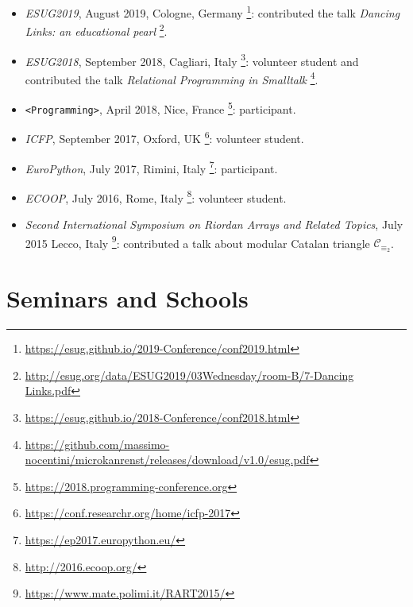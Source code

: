 \documentclass[a4paper]{article} %
\begin{document}
    \begin{itemize}
        \item \emph{ESUG2019}, August 2019, Cologne, Germany \footnote{\url{https://esug.github.io/2019-Conference/conf2019.html}}: 
		contributed the talk \textit{Dancing Links: an educational pearl} \footnote{\url{http://esug.org/data/ESUG2019/03Wednesday/room-B/7-Dancing Links.pdf}}.
        \item \emph{ESUG2018}, September 2018, Cagliari, Italy \footnote{\url{https://esug.github.io/2018-Conference/conf2018.html}}: volunteer student and
        contributed the talk \textit{Relational Programming in Smalltalk} \footnote{\url{https://github.com/massimo-nocentini/microkanrenst/releases/download/v1.0/esug.pdf}}.
        \item \texttt{<Programming>}, April 2018, Nice, France \footnote{\url{https://2018.programming-conference.org}}: participant.
        \item \emph{ICFP}, September 2017, Oxford, UK \footnote{\url{https://conf.researchr.org/home/icfp-2017}}: volunteer student.
        \item \emph{EuroPython}, July 2017, Rimini, Italy \footnote{\url{https://ep2017.europython.eu/}}: participant.
        \item \emph{ECOOP}, July 2016, Rome, Italy \footnote{\url{http://2016.ecoop.org/}}: volunteer student.
        \item \emph{Second International Symposium on Riordan Arrays and Related Topics}, 
            July 2015 Lecco, Italy \footnote{\url{https://www.mate.polimi.it/RART2015/}}: contributed a talk about modular Catalan triangle $\mathcal{C}_{\equiv_{2}}$.
    \end{itemize}

    \section{Seminars and Schools}
\end{document}
